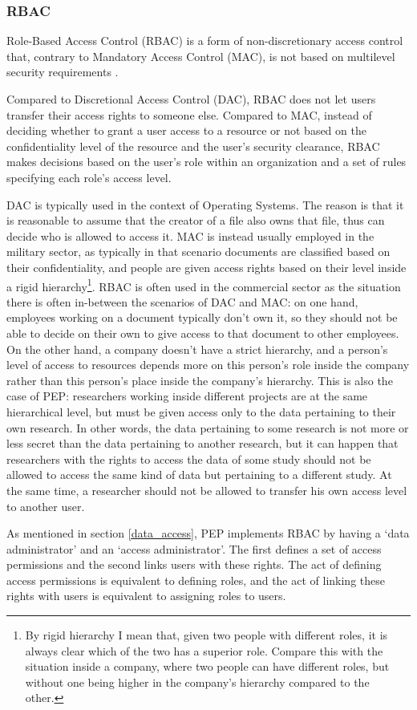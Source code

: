 \documentclass{report}
\begin{document}
\subsubsection{RBAC}
Role-Based Access Control (RBAC) is a form of non-discretionary access control that, contrary to Mandatory Access Control (MAC), is not based on multilevel security requirements \cite{rbac}. \par
Compared to Discretional Access Control (DAC), RBAC does not let users transfer their access rights to someone else. Compared to MAC, instead of deciding whether to grant a user access 
to a resource or not based on the confidentiality level of the resource and the user's security clearance, RBAC makes decisions based on the user's role within an organization and a set 
of rules specifying each role's access level. \par
DAC is typically used in the context of Operating Systems. The reason is that it is reasonable to assume that the creator of a file also owns that file, thus can decide who is
allowed to access it. MAC is instead usually employed in the military sector, as typically in that scenario documents are classified based on their confidentiality, and people are
given access rights based on their level inside a rigid hierarchy\footnote{By rigid hierarchy I mean that, given two people with different roles, it is always clear which of the two 
has a superior role. Compare this with the situation inside a company, where two people can have different roles, but without one being higher in the company's hierarchy compared to
the other.}. RBAC is often used in the commercial sector as the situation there is often in-between the scenarios of DAC and MAC: on one hand, employees working on a document
typically don't own it, so they should not be able to decide on their own to give access to that document to other employees. On the other hand, a company doesn't have a strict
hierarchy, and a person's level of access to resources depends more on this person's role inside the company rather than this person's place inside the company's hierarchy. This is
also the case of PEP: researchers working inside different projects are at the same hierarchical level, but must be given access only to the data pertaining to their own research. In
other words, the data pertaining to some research is not more or less secret than the data pertaining to another research, but it can happen that researchers with the rights to access
the data of some study should not be allowed to access the same kind of data but pertaining to a different study. At the same time, a researcher should not be allowed to transfer his
own access level to another user. \par
As mentioned in section \ref{data_access}, PEP implements RBAC by having a \enquote*{data administrator} and an \enquote*{access administrator}. The first defines a set of access permissions and the
second links users with these rights. The act of defining access permissions is equivalent to defining roles, and the act of linking these rights with users is equivalent to assigning
roles to users. 
\end{document}
